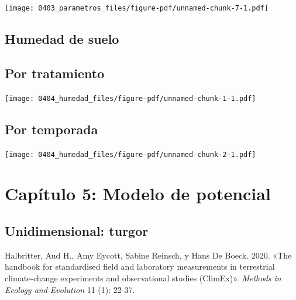 \documentclass[
  letterpaper,
  DIV=11,
  numbers=noendperiod]{scrreprt}
\newlength{\cslhangindent}
\newenvironment{CSLReferences}[2] %
 {\begin{list}{}{%
  \setlength{\itemindent}{0pt}
  \setlength{\leftmargin}{0pt}
  \setlength{\parsep}{0pt}
  \ifodd #1
   \setlength{\leftmargin}{\cslhangindent}
   \setlength{\itemindent}{-1\cslhangindent}
  \fi
  \setlength{\itemsep}{#2\baselineskip}}}
 {\end{list}}
\begin{document}
\begin{center}
\texttt{[image: 0403\_parametros\_files/figure-pdf/unnamed-chunk-7-1.pdf]}
\end{center}

\chapter{Humedad de suelo}\label{humedad-de-suelo-1}

\chapter{Por tratamiento}

\begin{center}
\texttt{[image: 0404\_humedad\_files/figure-pdf/unnamed-chunk-1-1.pdf]}
\end{center}

\chapter{Por temporada}

\begin{center}
\texttt{[image: 0404\_humedad\_files/figure-pdf/unnamed-chunk-2-1.pdf]}
\end{center}

\part{Capítulo 5: Modelo de potencial}

\chapter*{Unidimensional: turgor}\label{unidimensional-turgor}

\label{refs}
\begin{CSLReferences}{1}{0}
Halbritter, Aud H., Amy Eycott, Sabine Reinsch, y Hans De Boeck. 2020.
{«The handbook for standardised field and laboratory measurements in
terrestrial climate-change experiments and observational studies
(ClimEx)»}. \emph{Methods in Ecology and Evolution} 11 (1): 22-37.

\end{CSLReferences}
\end{document}
